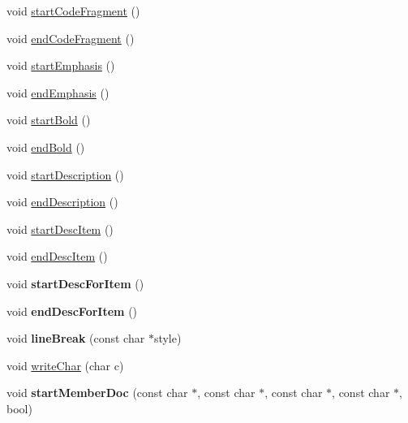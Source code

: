 \begin{DoxyCompactItemize}
\item 
void \hyperlink{class_html_generator_a631953fed580c2b82e39426604c928ac}{start\-Code\-Fragment} ()
\item 
void \hyperlink{class_html_generator_a0d97d57c34ed239bcf916104a71e10bf}{end\-Code\-Fragment} ()
\item 
void \hyperlink{class_html_generator_ab2f79d1f1a30e329f7ada3e51c04917e}{start\-Emphasis} ()
\item 
void \hyperlink{class_html_generator_a5c4adfb425dee0e192e5b606eab0114a}{end\-Emphasis} ()
\item 
void \hyperlink{class_html_generator_a6f230bea6c80b0a1847a9608c88fd45a}{start\-Bold} ()
\item 
void \hyperlink{class_html_generator_a1e1a209879148bfcb4b57ab294b37b90}{end\-Bold} ()
\item 
void \hyperlink{class_html_generator_ae87205938a124b2eac0d798631d4e5e6}{start\-Description} ()
\item 
void \hyperlink{class_html_generator_a5a0a6eb710a6b87c5dd8ea82b7a19dc4}{end\-Description} ()
\item 
void \hyperlink{class_html_generator_ab8a6797fe2e4cb968a4c13eea7c4c968}{start\-Desc\-Item} ()
\item 
void \hyperlink{class_html_generator_a080b8f2fa36e665da60bcfa982386ac8}{end\-Desc\-Item} ()
\item 
\hypertarget{class_html_generator_aaeedab997793b96cdfc94f8b628d5a80}{void {\bfseries start\-Desc\-For\-Item} ()}\label{class_html_generator_aaeedab997793b96cdfc94f8b628d5a80}

\item 
\hypertarget{class_html_generator_a5cae5c5213649bfad6105e91ac818870}{void {\bfseries end\-Desc\-For\-Item} ()}\label{class_html_generator_a5cae5c5213649bfad6105e91ac818870}

\item 
\hypertarget{class_html_generator_a4505ab23c2fade4a288bea75c131cd7a}{void {\bfseries line\-Break} (const char $\ast$style)}\label{class_html_generator_a4505ab23c2fade4a288bea75c131cd7a}

\item 
void \hyperlink{class_html_generator_a0031a638b9159c2d16d2988da4b901ab}{write\-Char} (char c)
\item 
\hypertarget{class_html_generator_ad767ef57c71199afc7cd587b07bf36c8}{void {\bfseries start\-Member\-Doc} (const char $\ast$, const char $\ast$, const char $\ast$, const char $\ast$, bool)}\label{class_html_generator_ad767ef57c71199afc7cd587b07bf36c8}


\end{DoxyCompactItemize}
